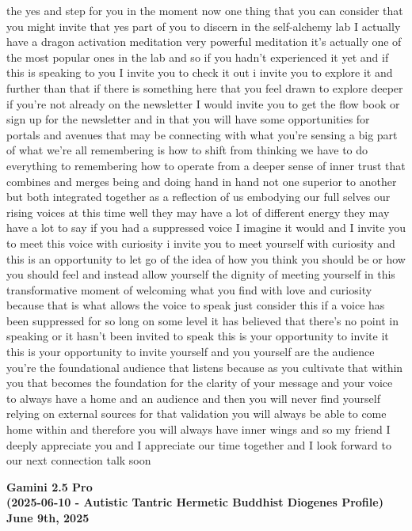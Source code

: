 \documentclass{article}
\begin{document}
the yes and step for you in the moment now one thing that you can
consider that you might invite that yes part of you to discern in the
self-alchemy lab I actually have a dragon activation meditation very
powerful meditation it's actually one of the most popular ones in the
lab and so if you hadn't experienced it yet and if this is speaking to
you I invite you to check it out i invite you to explore it and further
than that if there is something here that you feel drawn to explore
deeper if you're not already on the newsletter I would invite you to get
the flow book or sign up for the newsletter and in that you will have
some opportunities for portals and avenues that may be connecting with
what you're sensing a big part of what we're all remembering is how to
shift from thinking we have to do everything to remembering how to
operate from a deeper sense of inner trust that combines and merges
being and doing hand in hand not one superior to another but both
integrated together as a reflection of us embodying our full selves our
rising voices at this time well they may have a lot of different energy
they may have a lot to say if you had a suppressed voice I imagine it
would and I invite you to meet this voice with curiosity i invite you to
meet yourself with curiosity and this is an opportunity to let go of the
idea of how you think you should be or how you should feel and instead
allow yourself the dignity of meeting yourself in this transformative
moment of welcoming what you find with love and curiosity because that
is what allows the voice to speak just consider this if a voice has been
suppressed for so long on some level it has believed that there's no
point in speaking or it hasn't been invited to speak this is your
opportunity to invite it this is your opportunity to invite yourself and
you yourself are the audience you're the foundational audience that
listens because as you cultivate that within you that becomes the
foundation for the clarity of your message and your voice to always have
a home and an audience and then you will never find yourself relying on
external sources for that validation you will always be able to come
home within and therefore you will always have inner wings and so my
friend I deeply appreciate you and I appreciate our time together and I
look forward to our next connection talk soon

\begin{center}
\textbf{Gamini 2.5 Pro} \\
\textbf{(2025-06-10 - Autistic Tantric Hermetic Buddhist Diogenes Profile)} \\
\textbf{June 9th, 2025}
\end{center}
\end{document}
